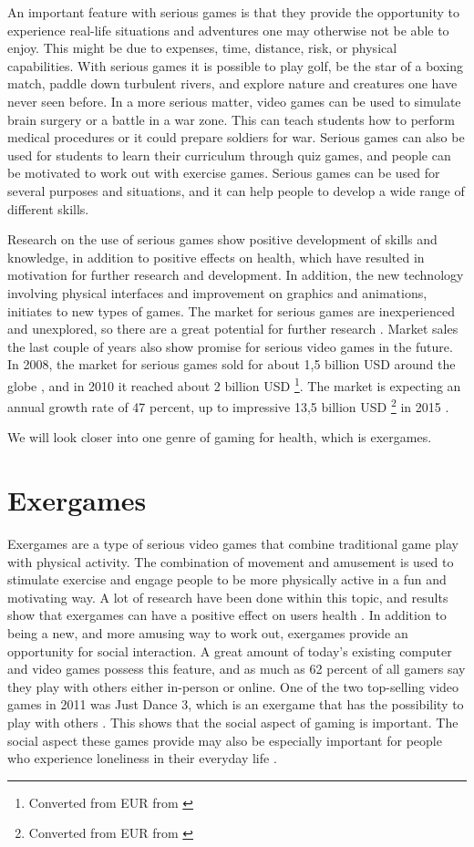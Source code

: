 An important feature with serious games is that they provide the opportunity to experience real-life situations and adventures one may otherwise not be able to enjoy. This might be due to expenses, time, distance, risk, or physical capabilities. With serious games it is possible to play golf, be the star of a boxing match, paddle down turbulent rivers, and explore nature and creatures one have never seen before. In a more serious matter, video games can be used to simulate brain surgery or a battle in a war zone. This can teach students how to perform medical procedures or it could prepare soldiers for war. Serious games can also be used for students to learn their curriculum through quiz games, and people can be motivated to work out with exercise games. Serious games can be used for several purposes and situations, and it can help people to develop a wide range of different skills. 

Research on the use of serious games show positive development of skills and knowledge, in addition to positive effects on health, which have resulted in motivation for further research and development. In addition, the new technology involving physical interfaces and improvement on graphics and animations, initiates to new types of games. The market for serious games are inexperienced and unexplored, so there are a great potential for further research \cite{alfingewang}. Market sales the last couple of years also show promise for serious video games in the future. In 2008, the market for serious games sold for about 1,5 billion USD around the globe \cite{alfingewang}, and in 2010 it reached about 2 billion USD \footnote{Converted from EUR from \cite{idate}}. The market is expecting an annual growth rate of 47 percent, up to impressive 13,5 billion USD \footnote{Converted from EUR from \cite{idate}} in 2015 \cite{idate}. 

We will look closer into one genre of gaming for health, which is exergames.  

\section{Exergames}
\label{sec:exergames}
Exergames are a type of serious video games that combine traditional game play with physical activity. The combination of movement and amusement is used to stimulate exercise and engage people to be more physically active in a fun and motivating way. A lot of research have been done within this topic, and results show that exergames can have a positive effect on users health \cite{excell} \cite{garcia2012exergames} \cite{taylor2011activity}. In addition to being a new, and more amusing way to work out, exergames provide an opportunity for social interaction. A great amount of today's existing computer and video games possess this feature, and as much as 62 percent of all gamers say they play with others either in-person or online. One of the two top-selling video games in 2011 was Just Dance 3, which is an exergame that has the possibility to play with others \cite{statistics2012}. This shows that the social aspect of gaming is important. The social aspect these games provide may also be especially important for people who experience loneliness in their everyday life \cite{exergamesforelderly}.

